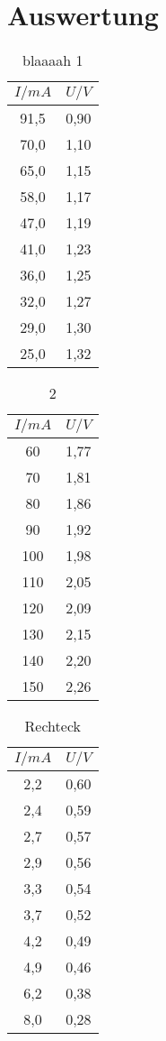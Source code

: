 \section{Auswertung}
\label{sec:Auswertung}


\begin{table}[H]
  \centering
  \caption{blaaaah 1}
  \begin{tabular}{c c}
    \toprule
     $I/mA$ & $U/V$  \\
    \midrule
    91,5 & 0,90\\
    70,0 & 1,10\\
    65,0 & 1,15\\
    58,0 & 1,17\\
    47,0 & 1,19\\
    41,0 & 1,23\\
    36,0 & 1,25\\
    32,0 & 1,27\\
    29,0 & 1,30\\
    25,0 & 1,32\\
  \bottomrule
  \end{tabular}
\end{table}


\begin{table}[H]
  \centering
  \caption{2}
  \begin{tabular}{c c}
    \toprule
     $I/mA$ & $U/V$  \\
    \midrule
    60 & 1,77\\
    70 & 1,81\\
    80 & 1,86\\
    90 & 1,92\\
    100 & 1,98\\
    110 & 2,05\\
    120 & 2,09\\
    130 & 2,15\\
    140 & 2,20\\
    150 & 2,26\\
   
  \bottomrule
  \end{tabular}
\end{table}

\begin{table}[H]
  \centering
  \caption{Rechteck}
  \begin{tabular}{c c}
    \toprule
     $I/mA$ & $U/V$  \\
    \midrule
    2,2 & 0,60 \\
    2,4 & 0,59 \\
    2,7 & 0,57 \\
    2,9 & 0,56 \\
    3,3 & 0,54 \\
    3,7 & 0,52 \\
    4,2 & 0,49 \\
    4,9 & 0,46 \\
    6,2 & 0,38 \\
    8,0 & 0,28 \\
   
  \bottomrule
  \end{tabular}
\end{table}

